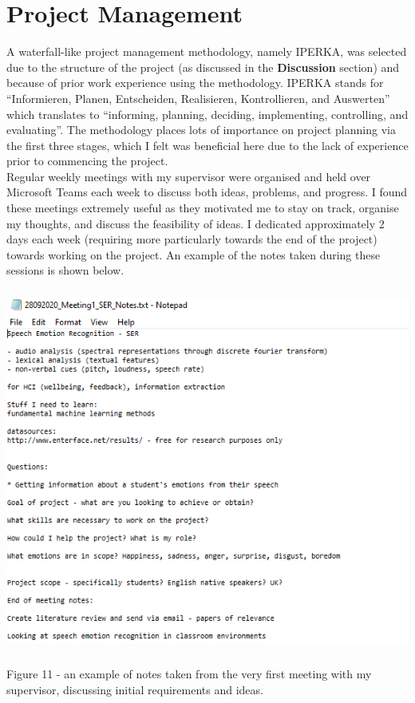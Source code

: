 \documentclass[12pt]{article}
\begin{document}
\section{Project Management}
A waterfall-like project management methodology, namely IPERKA, was selected due to the structure of the project (as discussed in the \textbf{Discussion} section) and because of prior work experience using the methodology. IPERKA stands for ``Informieren, Planen, Entscheiden, Realisieren, Kontrollieren, and Auswerten'' which translates to ``informing, planning, deciding, implementing, controlling, and evaluating''. The methodology places lots of importance on project planning via the first three stages, which I felt was beneficial here due to the lack of experience prior to commencing the project.
\\

\noindent Regular weekly meetings with my supervisor were organised and held over Microsoft Teams each week to discuss both ideas, problems, and progress. I found these meetings extremely useful as they motivated me to stay on track, organise my thoughts, and discuss the feasibility of ideas. I dedicated approximately 2 days each week (requiring more particularly towards the end of the project) towards working on the project. An example of the notes taken during these sessions is shown below.
\begin{center}
\includegraphics[width=15cm, height=12cm]{figure_11_notes}
\end{center}
Figure 11 - an example of notes taken from the very first meeting with my supervisor, discussing initial requirements and ideas.
\newpage
\end{document}
